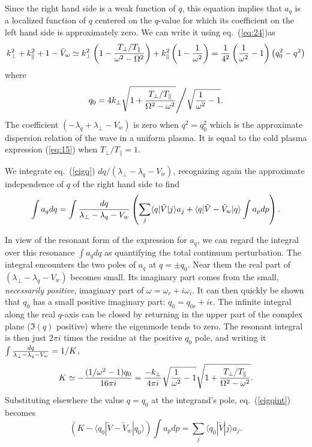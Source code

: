 \documentclass[12pt]{article}
\def\ket#1{|#1\rangle}
\def\bra#1{\langle#1}
\begin{document}
Since the right hand side is a weak function of $q$, this equation
implies that $a_q$ is a localized function of $q$ centered on the
$q$-value for which its coefficient on the left hand side is
approximately zero. We can write it using eq.\ (\ref{eq:24})as
\begin{equation}
  \label{}
  k_\perp^2+k_\parallel^2+1-\tilde
  V_w\simeq k_\perp^2\left(1-{T_\perp/T_\parallel\over\omega^2-\Omega^2}\right)
  +k_\parallel^2\left(1-{1\over\omega^2}\right)
= {1\over4^2}\left({1\over\omega^2}-1\right)\left(q_0^2-q^2\right)
\end{equation}
where
\begin{equation}
  \label{eq:26}
  q_0=4k_\perp\sqrt{1+{T_\perp/T_\parallel\over\Omega^2-\omega^2}}
  \Bigg/\sqrt{{1\over\omega^2}-1}.
\end{equation}
The coefficient $(-\lambda_q+\lambda_\perp-V_w) $ is zero when $q^2=q_0^2$ which is the approximate
dispersion relation of the wave in a uniform plasma. It is equal to the cold
plasma expression (\ref{eq:15}) when $T_\perp/T_\parallel=1$.



We integrate eq.\ (\ref{eigq})  $dq/(\lambda_\perp-\lambda_q-V_w)$, recognizing again the approximate independence of $q$ of
the right hand side to find
\begin{equation}
  \label{eigqint}
  \int a_q dq =\int {dq\over \lambda_\perp-\lambda_q-V_w}
  \left(\sum_j\bra{q}|\tilde{V}\ket{j}a_j
+\bra{q}|\tilde V-\tilde V_w\ket{q}\int a_pdp \right).
\end{equation}

In view of the resonant form of the expression for $a_q$, we can regard the
integral over this resonance $\int a_q dq$ as quantifying the total
continuum perturbation.  The integral encounters the two poles of $a_q$ at
$q=\pm q_0$.
Near them the real part of $(\lambda_\perp-\lambda_q-V_w)$ becomes small. Its
imaginary part comes from the small, \emph{necessarily positive},
imaginary part of
$\omega=\omega_r+i\omega_i$. It can then quickly be shown that
$q_0$ has a small positive imaginary part: $q_0=q_{0r}+i\epsilon$.
\iftrue%
The infinite integral along the real
$q$-axis can be closed by returning in the upper part of the complex
plane ($\Im(q)$ positive) where the eigenmode tends
to zero. The resonant integral is then just $2\pi i$ times the residue
at the positive $q_0$ pole, and writing it
$\int {dq\over \lambda_\perp-\lambda_q-V_w}=1/K$,
\begin{equation}
  \label{Kdef}
  K\simeq-{(1/\omega^2-1)q_0\over16\pi i}
  ={-k_\perp\over4\pi i}\sqrt{{1\over\omega^2}-1}
\sqrt{1+{T_\perp/T_\parallel\over\Omega^2-\omega^2}}.  
\end{equation}
Substituting elsewhere the
value $q=q_0$ at the integrand's pole, eq.\ (\ref{eigqint}) becomes
\begin{equation}
  \label{eigqint2}
  (K-\bra{q_0}|\tilde V-\tilde V_w\ket{q_0})\int a_pdp = \sum_j\bra{q_0}|\tilde{V}\ket{j}a_j.
\end{equation}
\end{document}
